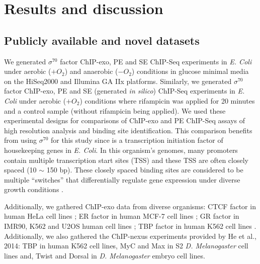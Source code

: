 \documentclass{bmcart}\usepackage[]{graphicx}\usepackage[]{color}
\newcommand{\sig}{\sigma^{70}}
\begin{document}
\section*{Results and discussion}
\label{sec:results}
\subsection*{Publicly available and novel datasets}

We generated $\sig$ factor ChIP-exo, PE and SE ChIP-Seq experiments in
\emph{E. Coli} under aerobic ($+O_2$) and anaerobic ($-O_2$)
conditions in glucose minimal media on the HiSeq2000 and Illumina GA
IIx platforms. Similarly, we generated $\sig$ factor ChIP-exo, PE and
SE (generated \emph{in silico}) ChIP-Seq experiments in \emph{E. Coli}
under aerobic ($+O_2$) conditions where rifampicin was applied for 20
minutes and a control sample (without rifampicin being applied). We
used these experimental designs for comparisons of ChIP-exo and PE
ChIP-Seq assays of high resolution analysis and binding site
identification. This comparison benefits from using $\sig$ for this
study since is a transcription initiation factor of housekeeping genes
in \emph{E. Coli}. In this organism's genomes, many promoters contain
multiple transcription start sites (TSS) and these TSS are often
closely spaced (10 $\sim$ 150 bp). These closely spaced binding sites
are considered to be multiple ``switches'' that differentially
regulate gene expression under diverse growth conditions
\cite{regulondb}.

Additionally, we gathered ChIP-exo data from diverse organisms: CTCF
factor in human HeLa cell lines \cite{exo1}; ER factor in human MCF-7
cell lines \cite{exoillumina}; GR factor in IMR90, K562 and U2OS human
cell lines \cite{starick15}; TBP factor in human K562 cell lines
\cite{venters13}. Additionally, we also gathered the ChIP-nexus
experiments provided by He et al., 2014: TBP in human K562 cell lines,
MyC and Max in S2 \emph{D. Melanogaster} cell lines and, Twist and
Dorsal in \emph{D. Melanogaster} embryo cell lines.
\end{document}
